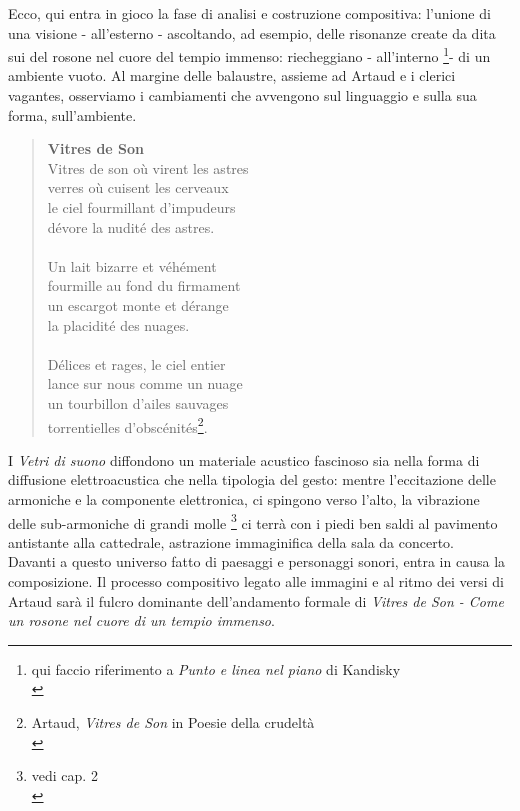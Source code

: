 Ecco, qui entra in gioco la fase di analisi e costruzione compositiva: l'unione di una visione - all'esterno - ascoltando, ad esempio, delle risonanze create da dita sui del rosone nel cuore del tempio immenso: riecheggiano - all'interno \footnote{qui faccio riferimento a \textit{Punto e linea nel piano} di Kandisky \\}- di un ambiente vuoto.
Al margine delle balaustre, assieme ad Artaud e i clerici vagantes, osserviamo i cambiamenti che avvengono sul linguaggio e sulla sua forma, sull'ambiente. \\
\begin{quotation}
\textbf{Vitres de Son} \\
Vitres de son où virent les astres \\
verres où cuisent les cerveaux \\
le ciel fourmillant d'impudeurs \\
dévore la nudité des astres. \\ \\ 
Un lait bizarre et véhément \\
fourmille au fond du firmament \\
un escargot monte et dérange \\
la placidité des nuages. \\ \\ 
Délices et rages, le ciel entier \\
lance sur nous comme un nuage \\
un tourbillon d'ailes sauvages \\
torrentielles d'obscénités\footnote{Artaud, \textit{Vitres de Son} in Poesie della crudeltà \\}. \\
\end{quotation}
I \textit{Vetri di suono} diffondono un materiale acustico fascinoso sia nella forma di diffusione elettroacustica che nella tipologia del gesto: mentre l'eccitazione delle armoniche e la componente elettronica, ci spingono verso l'alto, la vibrazione delle sub-armoniche di grandi molle \footnote{vedi cap. 2 \\} ci terrà con i piedi ben saldi al pavimento antistante alla cattedrale, astrazione immaginifica della sala da concerto. \\
Davanti a questo universo fatto di paesaggi e personaggi sonori, entra in causa la composizione. Il processo compositivo legato alle immagini e al ritmo dei versi di Artaud sarà il fulcro dominante dell'andamento formale di \textit{Vitres de Son - Come un rosone nel cuore di un tempio immenso}.
